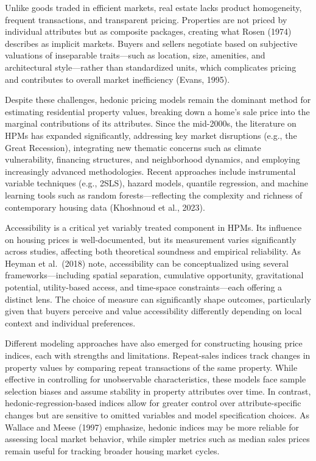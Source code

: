 \documentclass[
  12pt,
]{report}
\begin{document}
Unlike goods traded in efficient markets, real estate lacks product
homogeneity, frequent transactions, and transparent pricing. Properties
are not priced by individual attributes but as composite packages,
creating what Rosen (1974) describes as implicit markets. Buyers and
sellers negotiate based on subjective valuations of inseparable
traits---such as location, size, amenities, and architectural
style---rather than standardized units, which complicates pricing and
contributes to overall market inefficiency (Evans, 1995).

Despite these challenges, hedonic pricing models remain the dominant
method for estimating residential property values, breaking down a
home's sale price into the marginal contributions of its attributes.
Since the mid-2000s, the literature on HPMs has expanded significantly,
addressing key market disruptions (e.g., the Great Recession),
integrating new thematic concerns such as climate vulnerability,
financing structures, and neighborhood dynamics, and employing
increasingly advanced methodologies. Recent approaches include
instrumental variable techniques (e.g., 2SLS), hazard models, quantile
regression, and machine learning tools such as random
forests---reflecting the complexity and richness of contemporary housing
data (Khoshnoud et al., 2023).

Accessibility is a critical yet variably treated component in HPMs. Its
influence on housing prices is well-documented, but its measurement
varies significantly across studies, affecting both theoretical
soundness and empirical reliability. As Heyman et al.~(2018) note,
accessibility can be conceptualized using several frameworks---including
spatial separation, cumulative opportunity, gravitational potential,
utility-based access, and time-space constraints---each offering a
distinct lens. The choice of measure can significantly shape outcomes,
particularly given that buyers perceive and value accessibility
differently depending on local context and individual preferences.

Different modeling approaches have also emerged for constructing housing
price indices, each with strengths and limitations. Repeat-sales indices
track changes in property values by comparing repeat transactions of the
same property. While effective in controlling for unobservable
characteristics, these models face sample selection biases and assume
stability in property attributes over time. In contrast,
hedonic-regression-based indices allow for greater control over
attribute-specific changes but are sensitive to omitted variables and
model specification choices. As Wallace and Meese (1997) emphasize,
hedonic indices may be more reliable for assessing local market
behavior, while simpler metrics such as median sales prices remain
useful for tracking broader housing market cycles.
\end{document}
